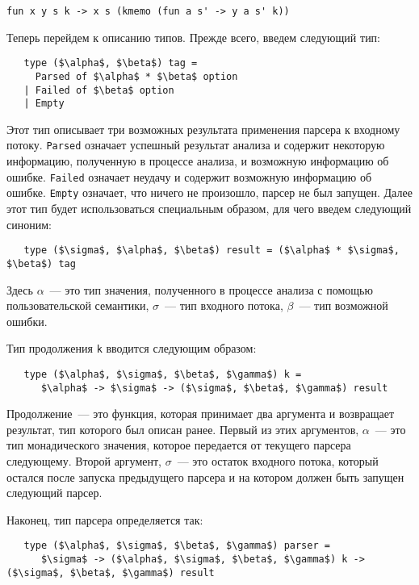 \documentclass[conference]{IEEEtran}
\begin{document}
\begin{lstlisting}[basicstyle=\small]
   fun x y s k -> x s (kmemo (fun a s' -> y a s' k))
\end{lstlisting}

Теперь перейдем к описанию типов. Прежде всего, введем следующий тип:

\begin{lstlisting}
   type ($\alpha$, $\beta$) tag =
     Parsed of $\alpha$ * $\beta$ option
   | Failed of $\beta$ option
   | Empty
\end{lstlisting}

Этот тип описывает три возможных результата применения парсера к входному потоку. \lstinline|Parsed| означает успешный результат анализа и содержит некоторую информацию, полученную в процессе
анализа, и возможную информацию об ошибке. \lstinline|Failed| означает неудачу и содержит возможную информацию об ошибке. \lstinline|Empty| означает, что ничего не произошло, парсер не был запущен.
Далее этот тип будет использоваться специальным образом, для чего введем следующий синоним:

\begin{lstlisting}
   type ($\sigma$, $\alpha$, $\beta$) result = ($\alpha$ * $\sigma$, $\beta$) tag
\end{lstlisting}

Здесь $\alpha$~--- это тип значения, полученного в процессе анализа с помощью пользовательской семантики, $\sigma$~--- тип входного потока, $\beta$~--- тип возможной ошибки.

Тип продолжения \lstinline|k| вводится следующим образом:

\begin{lstlisting}
   type ($\alpha$, $\sigma$, $\beta$, $\gamma$) k =
      $\alpha$ -> $\sigma$ -> ($\sigma$, $\beta$, $\gamma$) result
\end{lstlisting}

Продолжение~--- это функция, которая принимает два аргумента и возвращает результат, тип которого был описан ранее. Первый из этих аргументов, $\alpha$~--- это тип монадического значения,
которое передается от текущего парсера следующему. Второй аргумент, $\sigma$~--- это остаток входного потока, который остался после запуска предыдущего парсера и на котором должен быть
запущен следующий парсер.

Наконец, тип парсера определяется так:

\begin{lstlisting}
   type ($\alpha$, $\sigma$, $\beta$, $\gamma$) parser =
      $\sigma$ -> ($\alpha$, $\sigma$, $\beta$, $\gamma$) k -> ($\sigma$, $\beta$, $\gamma$) result
\end{lstlisting}
\end{document}
